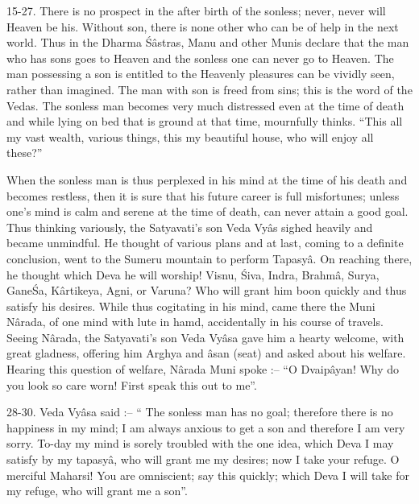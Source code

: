 15-27. There is no prospect in the after birth of the sonless; never, never will Heaven be his. Without son, there is none other who can be of help in the next world. Thus in the Dharma \'S\^astras, Manu and other Munis declare that the man who has sons goes to Heaven and the sonless one can never go to Heaven. The man possessing a son is entitled to the Heavenly pleasures can be vividly seen, rather than imagined. The man with son is freed from sins; this is the word of the Vedas. The sonless man becomes very much distressed even at the time of death and while lying on bed that is ground at that time, mournfully thinks. ``This all my vast wealth, various things, this my beautiful house, who will enjoy all these?''

When the sonless man is thus perplexed in his mind at the time of his death and becomes restless, then it is sure that his future career is full misfortunes; unless one’s mind is calm and serene at the time of death, can never attain a good goal. Thus thinking variously, the Satyavati's son Veda Vy\^as sighed heavily and became unmindful. He thought of various plans and at last, coming to a definite conclusion, went to the Sumeru mountain to perform Tapasy\^a. On reaching there, he thought which Deva he will worship! Visnu, \'Siva, Indra, Brahm\^a, Surya, Gane\'Sa, K\^artikeya, Agni, or Varuna? Who will grant him boon quickly and thus satisfy his desires. While thus cogitating in his mind, came there the Muni N\^arada, of one mind with lute in hamd, accidentally in his course of travels. Seeing N\^arada, the Satyavati’s son Veda Vy\^asa gave him a hearty welcome, with great gladness, offering him Arghya and \^asan (seat) and asked about his welfare. Hearing this question of welfare, N\^arada Muni spoke :-- ``O Dvaip\^ayan! Why do you look so care worn! First speak this out to me''.

28-30. Veda Vy\^asa said :-- `` The sonless man has no goal; therefore there is no happiness in my mind; I am always anxious to get a son and therefore I am very sorry. To-day my mind is sorely troubled with the one idea, which Deva I may satisfy by my tapasy\^a, who will grant me my desires; now I take your refuge. O merciful Maharsi! You are omniscient; say this quickly; which Deva I will take for my refuge, who will grant me a son''.

